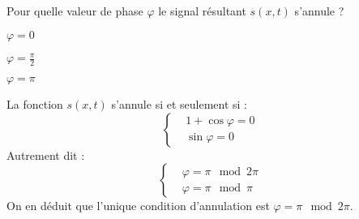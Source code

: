 \vspace*{0.4cm}
\begin{enonce}
	Pour quelle valeur de phase $\varphi$ le signal résultant $s\left(x,t\right)$ s'annule ? 
	
	\begin{listeQCM3Colonnes}
	\item $\varphi=0$
	\item $\varphi=\frac{\pi}{2}$
	\item $\varphi=\pi$
	\end{listeQCM3Colonnes}
	\smallskip
\end{enonce}

\reponse{\reponseC{}}

\begin{corrige}
	La fonction $s\left(x,t\right)$ s'annule si et seulement si :
	\begin{equation*}
		\begin{cases}
		& 1+ \cos \varphi = 0 \\
		& \sin \varphi = 0
		\end{cases}
	\end{equation*}
Autrement dit :
\begin{equation*}
	\begin{cases}
		& \varphi = \pi \mod 2\pi \\
		& \varphi = \pi \mod \pi
	\end{cases}
\end{equation*}
	On en déduit que l'unique condition d'annulation est $\varphi = \pi \mod 2\pi$.
\end{corrige}


\finEntrainement







\hauteurLargeurCadreReponse		{6mm}{6.75cm}
\initialisationEntrainement


